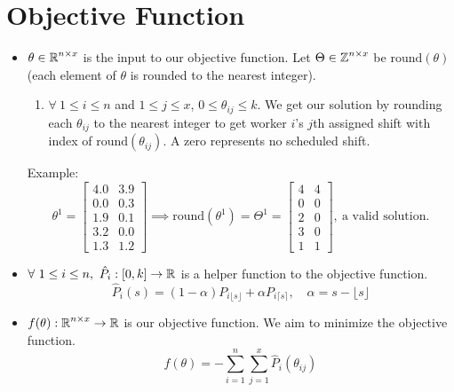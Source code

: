 \documentclass{article}
\begin{document}
\begin{itemize}
\end{itemize}


\section*{Objective Function}
\begin{itemize}
    \item $\theta\in\operatorname{\mathbb{R}}^{n\times x}$ is the input to our objective function. Let $\Theta\in\operatorname{\mathbb{Z}}^{n\times x}$ be $\text{round}(\theta)$ (each element of $\theta$ is rounded to the nearest integer).
    \begin{enumerate}[label=]
        \item $\forall\ 1\le i\le n$ and $1\le j\le x$, $0\le\theta_{ij}\le k$. We get our solution by rounding each $\theta_{ij}$ to the nearest integer to get worker $i$'s $j$th assigned shift with index of $\text{round}(\theta_{ij})$. A zero represents no scheduled shift.
    \end{enumerate}
    Example:
        \[\theta^1=\begin{bmatrix}
            4.0&3.9\\
            0.0&0.3\\
            1.9&0.1\\
            3.2&0.0\\
            1.3&1.2
        \end{bmatrix}\implies\text{round}(\theta^1)=\Theta^1=\begin{bmatrix}
            4&4\\
            0&0\\
            2&0\\
            3&0\\
            1&1
        \end{bmatrix},\ \text{a valid solution.}\]
    \item $\forall\ 1\le i\le n,\ \hat P_i:[0,k]\rightarrow\operatorname{\mathbb{R}}$ is a helper function to the objective function.
        \[\hat P_i(s) = (1-\alpha)P_{i\lfloor s\rfloor} + \alpha P_{i\lceil s\rceil},\quad \alpha=s-\lfloor s\rfloor\]
    \item $f(\theta):\operatorname{\mathbb{R}}^{n\times x}\rightarrow\operatorname{\mathbb{R}}$ is our objective function. We aim to minimize the objective function.
        \[f(\theta) = -\sum_{i=1}^{n}\sum_{j=1}^{x}\hat P_i(\theta_{ij})\]
\end{itemize}
\end{document}
